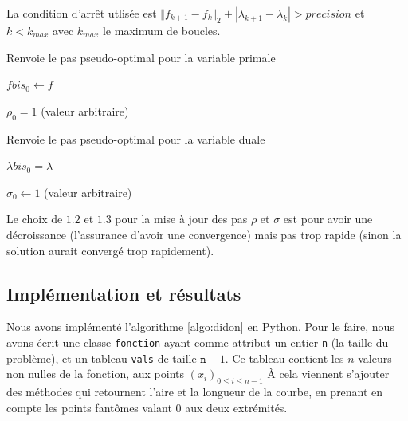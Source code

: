 \documentclass[10pt,a4paper]{article}
\newcommand{\R}{\mathbb{R}}
\theoremstyle{plain}
\theoremstyle{definition}
\begin{document}
La condition d'arrêt utlisée est $\Vert f_{k+1}-f_k\Vert_2 + |\lambda_{k+1}-\lambda_k| > precision$ et $k < k_{max}$ avec $k_{max}$ le maximum de boucles.

\begin{algorithm}
\caption{Renvoie le pas pseudo-optimal pour la variable primale}
\label{algo:primale}

	\KwIn{$f \in \R^n$ et $\lambda \in \R$}

	$fbis_0 \leftarrow f$

	$\rho_0 = 1$ (valeur arbitraire)


\end{algorithm}

\begin{algorithm}
	\caption{Renvoie le pas pseudo-optimal pour la variable duale}
	\label{algo:duale}
	
	\KwIn{$f \in \R^n$ et $\lambda \in \R$}
	$\lambda bis_0 = \lambda$

	$\sigma_0 \leftarrow 1$ (valeur arbitraire)

	
\end{algorithm}

Le choix de $1.2$ et $1.3$ pour la mise à jour des pas $\rho$ et $\sigma$ est pour avoir une décroissance (l'assurance d'avoir une convergence) mais pas trop rapide (sinon la solution aurait convergé trop rapidement).




\subsection{Implémentation et résultats}

Nous avons implémenté l'algorithme \ref{algo:didon} en Python. Pour le faire, nous avons écrit une classe \texttt{fonction} ayant comme attribut un entier \texttt{n} (la taille du problème), et un tableau \texttt{vals} de taille $\texttt{n}-1$. Ce tableau contient les $n$ valeurs non nulles de la fonction, aux points $(x_i)_{0\leqslant i\leqslant n-1}$ À cela viennent s'ajouter des méthodes qui retournent l'aire et la longueur de la courbe, en prenant en compte les points \og fantômes \fg{} valant 0 aux deux extrémités.
\end{document}
